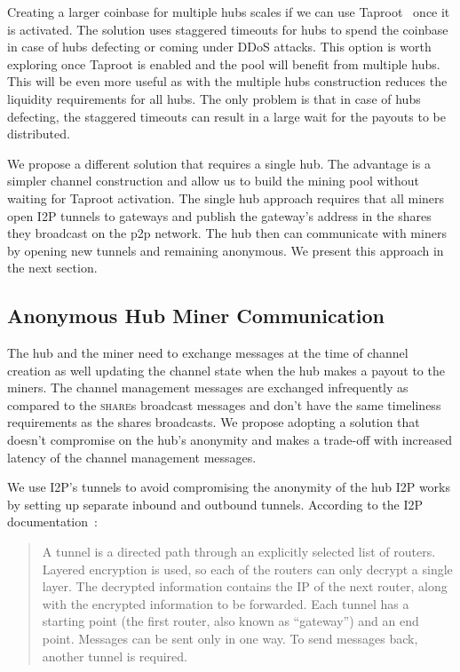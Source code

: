 \documentclass{article}
\begin{document}
Creating a larger coinbase for multiple hubs scales if we can use
Taproot~\cite{bip340,bip341, bip342} once it is activated. The
solution uses staggered timeouts for hubs to spend the coinbase in
case of hubs defecting or coming under DDoS attacks. This option is
worth exploring once Taproot is enabled and the pool will benefit from
multiple hubs. This will be even more useful as with the multiple hubs
construction reduces the liquidity requirements for all hubs. The only
problem is that in case of hubs defecting, the staggered timeouts can
result in a large wait for the payouts to be distributed.

We propose a different solution that requires a single hub. The
advantage is a simpler channel construction and allow us to build the
mining pool without waiting for Taproot activation. The single hub
approach requires that all miners open I2P tunnels to gateways and
publish the gateway's address in the shares they broadcast on the p2p
network. The hub then can communicate with miners by opening new
tunnels and remaining anonymous. We present this approach in the next
section.

\subsection{Anonymous Hub Miner
  Communication}\label{sec:hub-miner-communication}

The hub and the miner need to exchange messages at the time of channel
creation as well updating the channel state when the hub makes a
payout to the miners. The channel management messages are exchanged
infrequently as compared to the \textsc{share}s broadcast messages and
don't have the same timeliness requirements as the shares
broadcasts. We propose adopting a solution that doesn't compromise on
the hub's anonymity and makes a trade-off with increased latency of
the channel management messages.

We use I2P's tunnels to avoid compromising the anonymity of the hub
I2P works by setting up separate inbound and outbound
tunnels. According to the I2P documentation~\cite{i2p-tech-intro}:

\begin{quote}
  A tunnel is a directed path through an explicitly selected list of
  routers. Layered encryption is used, so each of the routers can only
  decrypt a single layer. The decrypted information contains the IP of
  the next router, along with the encrypted information to be
  forwarded. Each tunnel has a starting point (the first router, also
  known as ``gateway'') and an end point. Messages can be sent only in
  one way. To send messages back, another tunnel is required.
\end{quote}
\end{document}
